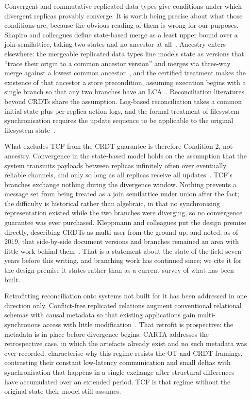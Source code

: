 Convergent and commutative replicated data types give conditions under which
divergent replicas provably converge. It is worth being precise about what those
conditions are, because the obvious reading of them is wrong for our purposes.
Shapiro and colleagues define state-based merge as a least upper bound over a join
semilattice, taking two states and no ancestor at all~\citep{shapiro2011crdt}.
Ancestry enters elsewhere: the mergeable replicated data types line models state
as versions that ``trace their origin to a common ancestor version'' and merges via
three-way merge against a lowest common ancestor~\citep{kaki2019mergeable}, and the
certified treatment makes the existence of that ancestor a store precondition,
assuming execution begins with a single branch so that any two branches have an
LCA~\citep{soundarapandian2022certified}. Reconciliation literatures beyond CRDTs
share the assumption. Log-based reconciliation takes a common initial state plus
per-replica action logs, and the formal treatment of filesystem synchronisation
requires the update sequence to be applicable to the original filesystem
state~\citep{csirmaz2022sync}.

What excludes TCF from the CRDT guarantee is therefore Condition 2, not ancestry.
Convergence in the state-based model holds on the assumption that the system
transmits payloads between replicas infinitely often over eventually reliable
channels, and only so long as all replicas receive all
updates~\citep{shapiro2011crdt}. TCF's branches exchange nothing during the
divergence window. Nothing prevents a message set from being treated as a join
semilattice under union after the fact; the difficulty is historical rather than
algebraic, in that no synchronising representation existed while the two branches
were diverging, so no convergence guarantee was ever purchased. Kleppmann and
colleagues put the design premise directly, describing CRDTs as multi-user from the
ground up, and noted, as of 2019, that side-by-side document versions and branches
remained an area with little work behind
them~\citep{kleppmann2019localfirst}. That is a statement about the state of the
field seven years before this writing, and branching work has continued since; we
cite it for the design premise it states rather than as a current survey of what
has been built.

Retrofitting reconciliation onto systems not built for it has been addressed in one
direction only. Conflict-free replicated relations augment conventional relational
schemas with causal metadata so that existing applications gain multi-synchronous
access with little modification~\citep{yu2020crr}. That retrofit is prospective:
the metadata is in place before divergence begins. CARTA addresses the
retrospective case, in which the artefacts already exist and no such metadata was
ever recorded. \citet{csirmaz2022sync} characterise why this regime resists the OT
and CRDT framings, contrasting their constant low-latency communication and small
deltas with synchronisation that happens in a single exchange after structural
differences have accumulated over an extended period. TCF is that regime without
the original state their model still assumes.

